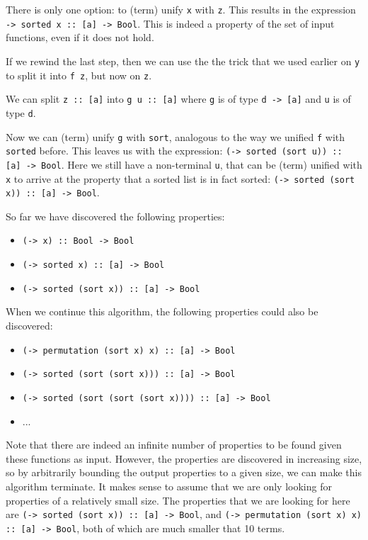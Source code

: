 \documentclass[a4paper, 11pt]{article}
\newcommand{\h}[1]{\texttt{#1}}
\begin{document}
There is only one option: to (term) unify \h{x} with \h{z}.
This results in the expression \h{\a -> sorted x :: [a] -> Bool}.
This is indeed a property of the set of input functions, even if it does not hold.

If we rewind the last step, then we can use the the trick that we used earlier on \h{y} to split it into \h{f z}, but now on \h{z}.

We can split \h{z :: [a]} into \h{g u :: [a]} where \h{g} is of type \h{d -> [a]} and \h{u} is of type \h{d}.

Now we can (term) unify \h{g} with \h{sort}, analogous to the way we unified \h{f} with \h{sorted} before.
This leaves us with the expression: \h{(\a -> sorted (sort u)) :: [a] -> Bool}.
Here we still have a non-terminal \h{u}, that can be (term) unified with \h{x} to arrive at the property that a sorted list is in fact sorted:
\h{(\x -> sorted (sort x)) :: [a] -> Bool}.

So far we have discovered the following properties:

\begin{itemize}
  \item \h{(\x -> x) :: Bool -> Bool}
  \item \h{(\x -> sorted x) :: [a] -> Bool}
  \item \h{(\x -> sorted (sort x)) :: [a] -> Bool}
\end{itemize}

When we continue this algorithm, the following properties could also be discovered:

\begin{itemize}
  \item \h{(\x -> permutation (sort x) x) :: [a] -> Bool}
  \item \h{(\x -> sorted (sort (sort x))) :: [a] -> Bool}
  \item \h{(\x -> sorted (sort (sort (sort x)))) :: [a] -> Bool}
  \item ...
\end{itemize}

Note that there are indeed an infinite number of properties to be found given these functions as input.
However, the properties are discovered in increasing size, so by arbitrarily bounding the output properties to a given size, we can make this algorithm terminate.
It makes sense to assume that we are only looking for properties of a relatively small size.
The properties that we are looking for here are \h{(\x -> sorted (sort x)) :: [a] -> Bool}, and \h{(\x -> permutation (sort x) x) :: [a] -> Bool}, both of which are much smaller that 10 terms.
\end{document}
